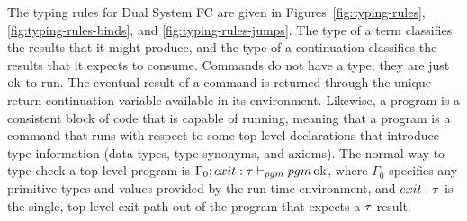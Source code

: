 \documentclass{article}
\begin{document}
The typing rules for Dual System FC are given in Figures~\ref{fig:typing-rules},
\ref{fig:typing-rules-binds}, and \ref{fig:typing-rules-jumps}.  The type of a
term classifies the results that it might produce, and the type of a
continuation classifies the results that it expects to consume.  Commands do not
have a type; they are just $\operatorname{ok}$ to run.  The eventual result of a command is
returned through the unique return continuation variable available in its
environment.  Likewise, a program is a consistent block of code that is capable
of running, meaning that a program is a command that runs with respect to some
top-level declarations that introduce type information (data types, type
synonyms, and axioms).  The normal way to type-check a top-level program is
$\Gamma_0; exit:\tau \vdash_{pgm} pgm \operatorname{ok}$, where $\Gamma_0$ specifies any primitive
types and values provided by the run-time environment, and $exit:\tau$ is the
single, top-level exit path out of the program that expects a $\tau$ result.
\end{document}
